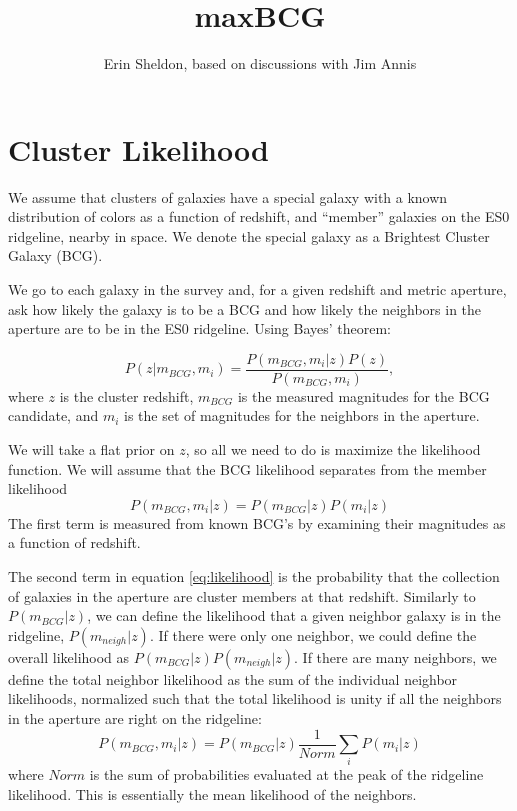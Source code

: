 \documentclass[preprint]{aastex}
\begin{document}
\title{maxBCG}
\author{Erin Sheldon, based on discussions with Jim Annis}

\section{Cluster Likelihood}

We assume that clusters of galaxies have a special galaxy with a known
distribution of colors as a function of redshift, and ``member'' galaxies on
the ES0 ridgeline, nearby in space.  We denote the special galaxy as a
Brightest Cluster Galaxy (BCG). 

We go to each galaxy in the survey and, for a given redshift and metric
aperture, ask how likely the galaxy is to be a BCG and how likely the 
neighbors in the aperture are to be in the ES0 ridgeline. Using Bayes'
theorem:

\begin{equation} \label{eq:posterior}
P(z | m_{BCG}, m_i) = \frac{ P(m_{BCG}, m_i | z) P(z) }{P(m_{BCG}, m_i)},
\end{equation}
where $z$ is the
cluster redshift, $m_{BCG}$ is the measured magnitudes for the BCG candidate,
and $m_i$ is the set of magnitudes for the neighbors in the aperture.

We will take a flat prior on $z$, so all we need to do is maximize the
likelihood function.  We will assume that the BCG likelihood separates from the
member likelihood
\begin{equation} \label{eq:likelihood}
P(m_{BCG}, m_i | z) = P(m_{BCG}|z)P(m_i | z)
\end{equation}
The first term is measured from known BCG's by examining their magnitudes
as a function of redshift.

The second term in equation \ref{eq:likelihood} is the probability that the
collection of galaxies in the aperture are cluster members at that redshift.
Similarly to $P(m_{BCG} | z)$, we can define the likelihood that a given
neighbor galaxy is in the ridgeline, $P(m_{neigh} | z)$.  If there were only
one neighbor, we could define the overall likelihood as $P(m_{BCG} |
z)P(m_{neigh} | z)$.  If there are many neighbors, we define the total neighbor
likelihood as the sum of the individual neighbor likelihoods, normalized such
that the total likelihood is unity if all the neighbors in the aperture are
right on the ridgeline:
\begin{equation} \label{eq:sumlike}
P(m_{BCG}, m_i | z) = P(m_{BCG}|z)\frac{1}{Norm}\sum_i P(m_i | z)
\end{equation}
where $Norm$ is the sum of probabilities evaluated at the peak of the 
ridgeline likelihood.  This is essentially the mean likelihood of the 
neighbors.  
\end{document}
